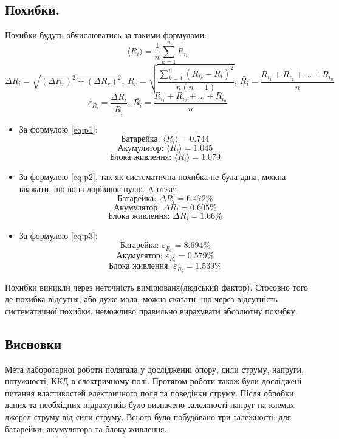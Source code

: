 \documentclass[a4paper,12pt]{article}
\begin{document}
\begin{justify}
	\subsection{Похибки.}
	Похибки будуть обчислюватись за такими формулами:
	\begin{equation}\label{eq:p1}
		\langle R_i\rangle=\dfrac1n\sum_{k=1}^{n}R_{i_k}
	\end{equation}
	\begin{equation}\label{eq:p2}
		\Delta R_i=\sqrt{(\Delta R_r)^2+(\Delta R_s)^2},\>R_r=\sqrt{\dfrac{\displaystyle\sum_{k=1}^{n}(R_{i_k}-\bar{R_i})^2}{n(n-1)}},\>\bar{R_i}=\dfrac{R_{i_1}+R_{i_2}+\dots+R_{i_n}}{n}
	\end{equation}	
	\begin{equation}\label{eq:p3}
		\varepsilon_{R_i}=\dfrac{\Delta R_i}{\bar{R_i}},\>\bar{R_i}=\dfrac{R_{i_1}+R_{i_2}+\dots+R_{i_n}}{n}
	\end{equation}
	\begin{itemize}
		\item За формулою \ref{eq:p1}: $$\textrm{Батарейка: }\langle R_i\rangle=0.744$$ $$\textrm{Акумулятор: }\langle R_i\rangle=1.045$$ $$\textrm{Блока живлення: }\langle R_i\rangle=1.079$$
		\item За формулою \ref{eq:p2}, так як систематична похибка не була дана, можна вважати, що вона дорівнює нулю. A отже: $$\textrm{Батарейка: }\Delta R_i=6.472\%$$ $$\textrm{Акумулятор: }\Delta R_i=0.605\%$$ $$\textrm{Блока живлення: }\Delta R_i=1.66\%$$
		\item За формулою \ref{eq:p3}: $$\textrm{Батарейка: }\varepsilon_{R_i}=8.694\%$$ $$\textrm{Акумулятор: }\varepsilon_{R_i}=0.579\%$$ $$\textrm{Блока живлення: }\varepsilon_{R_i}=1.539\%$$
	\end{itemize}
	Похибки виникли через неточність вимірюваня(людський фактор). Стосовно того де похибка відсутня, або дуже мала, можна сказати, що через відсутність систематичної похибки, неможливо правильно вирахувати абсолютну похибку.
	
	\subsection{Висновки}	
	Мета лаборотарної роботи полягала у дослідженні опору, сили струму, напруги, потужності, ККД в електричному полі. Протягом роботи також були досліджені питання властивостей електричного поля та поведінки струму. Після обробки даних та необхідних підрахунків було визначено залежності напруг на клемах джерел струму від сили струму. Всього було побудовано три залежності: для батарейки, акумулятора та блоку живлення. 

\end{justify}
\end{document}
